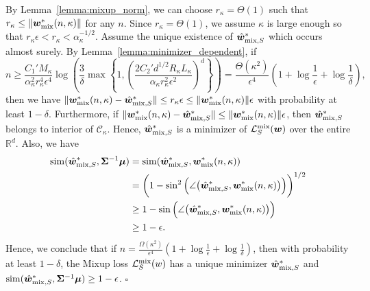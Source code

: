 By Lemma~\ref{lemma:mixup_norm}, we can choose $r_\kappa = \Theta(1)$ such that 
 $r_\kappa \leq \lVert {\bm{w}}^*_\mathrm{mix}(n,\kappa) \rVert$ for any $n$. Since $r_\kappa = \Theta(1)$, we assume $\kappa$ is large enough so that 
$r_\kappa \epsilon < r_\kappa <\alpha_\kappa^{-1/2}$.
Assume the unique existence of $\hat{{\bm{w}}}_{\mathrm{mix},S}^*$ which occurs almost surely. 
By Lemma~\ref{lemma:minimizer_dependent}, if
\begin{equation*}
    n \geq \frac{C_1'M_\kappa}{\alpha_\kappa^2 r_\kappa^4 \epsilon^4} \log \left( \frac{3}{\delta} \max \left\{ 1, \left( \frac{2C_2'd^{1/2}R_\kappa L_\kappa}{\alpha_\kappa r_\kappa ^2 \epsilon^2} \right)^d  \right\} \right) = \frac{\Theta(\kappa^2)}{\epsilon^4} \left (1+ \log \frac{1}{\epsilon} + \log \frac{1}{\delta} \right ),
\end{equation*}
then we have $\lVert{\bm{w}}^*_\mathrm{mix}(n,\kappa) - \hat{{\bm{w}}}_{\mathrm{mix},S}^* \rVert \leq  r_\kappa \epsilon \leq \lVert{\bm{w}}^*_\mathrm{mix}(n,\kappa) \rVert \epsilon$ with probability at least $1-\delta$.
Furthermore, if $\lVert {\bm{w}}^*_\mathrm{mix}(n,\kappa) - \hat{{\bm{w}}}_{\mathrm{mix},S}^* \rVert \leq  \lVert {\bm{w}}^*_\mathrm{mix}(n,\kappa) \rVert \epsilon$, then $\hat{{\bm{w}}}_{\mathrm{mix},S}^*$ belongs to interior of $\mathcal{C}_\kappa$. Hence, $\hat{{\bm{w}}}_{\mathrm{mix},S}^*$ is a minimizer of $\mathcal{L}_S^\mathrm{mix}({\bm{w}})$ over the entire $\mathbb{R}^d$. Also, we have
\begin{align*}
    \mathrm{sim} ( \hat{{\bm{w}}}_{\mathrm{mix},S}^*, {\bm{\Sigma}}^{-1}{\bm{\mu}}) &=  \mathrm{sim} ( \hat{{\bm{w}}}_{\mathrm{mix},S}^*,{\bm{w}}^*_\mathrm{mix}(n,\kappa))\\
    &= \bigg (1- \sin^2\Big (\angle \big (\hat{{\bm{w}}}_{\mathrm{mix},S}^*, {\bm{w}}^*_\mathrm{mix}(n,\kappa) \big ) \Big ) \bigg)^{1/2}\\
    &\geq 1- \sin\Big (\angle\big (\hat{{\bm{w}}}_{\mathrm{mix},S}^*, {\bm{w}}^*_\mathrm{mix}(n,\kappa) \big) \Big)\\
    &\geq 1- \epsilon.
\end{align*}
Hence, we conclude that if $n = \frac{\Omega(\kappa^2)}{\epsilon^4} \left (1+ \log \frac{1}{\epsilon} + \log \frac{1}{\delta} \right)$, then
with probability at least $1-\delta$, the Mixup loss $\mathcal{L}_S^\mathrm{mix}(w)$ has a unique minimizer $\hat{{\bm{w}}}_{\mathrm{mix},S}^*$ and $\mathrm{sim} ( \hat{{\bm{w}}}_{\mathrm{mix},S}^*, {\bm{\Sigma}}^{-1}{\bm{\mu}})\geq 1- \epsilon$. \hfill $\square$

